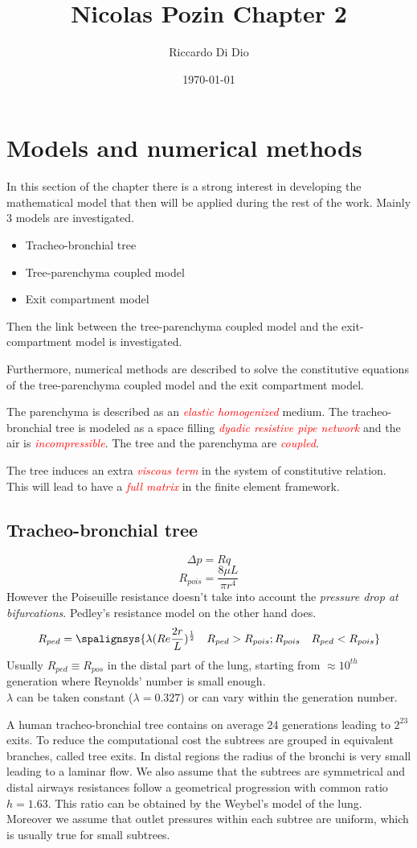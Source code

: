 \documentclass[11pt]{article}
\title{\vspace{-3.0cm}Nicolas Pozin Chapter 2}
\author{Riccardo Di Dio}
\date{\today}
\begin{document}
\maketitle
\section{Models and numerical methods}
In this section of the chapter there is a strong interest in developing the mathematical model that then will be applied during the rest of the work. Mainly 3 models are investigated.
\begin{itemize}
\item Tracheo-bronchial tree
\item Tree-parenchyma coupled model
\item Exit compartment model
\end{itemize}
Then the link between the tree-parenchyma coupled model and the exit-compartment model is investigated.

Furthermore, numerical methods are described to solve the constitutive equations of the tree-parenchyma coupled model and the exit compartment model.

The parenchyma is described as an \textcolor{red}{\emph{elastic homogenized}} medium. The tracheo-bronchial tree is modeled as a space filling \textcolor{red}{\emph{dyadic resistive pipe network}} and the air is \textcolor{red}{\emph{incompressible}}. The tree and the parenchyma are \textcolor{red}{\emph{coupled}}.

The tree induces an extra \textcolor{red}{\emph{viscous term}} in the system of constitutive relation. This will lead to have a \textcolor{red}{\emph{full matrix}} in the finite element framework.
\subsection{Tracheo-bronchial tree}
$$\Delta p = Rq$$
$$R_{pois} = \frac{8\mu L}{\pi r^4}$$
However the Poiseuille resistance doesn't take into account the \emph{pressure drop at bifurcations}. Pedley's resistance model on the other hand does.
$$R_{ped} = \spalignsys{\lambda(Re\frac{2r}{L})^\frac{1}{2} \hspace{1em} R_{ped} > R_{pois};
R_{pois} \hspace{1em} R_{ped} < R_{pois}}$$
Usually $R_{ped} \equiv R_{pos}$ in the distal part of the lung, starting from $\approx 10^{th}$ generation where Reynolds' number is small enough.\\
$\lambda$ can be taken constant ($\lambda = 0.327$) or can vary within the generation number.\par
A human tracheo-bronchial tree contains on average 24 generations leading to $2^{23}$ exits. To reduce the computational cost the subtrees are grouped in equivalent branches, called tree exits. In distal regions the radius of the bronchi is very small leading to a laminar flow. We also assume that the subtrees are symmetrical and distal airways resistances follow a geometrical progression with common ratio $h = 1.63$.
This ratio can be obtained by the Weybel's model of the lung. Moreover we assume that outlet pressures within each subtree are uniform, which is usually true for small subtrees.
\end{document}
